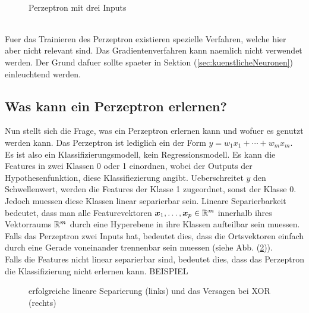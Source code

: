 \\
\begin{figure}[h!]
  \centering
  \caption{Perzeptron mit drei Inputs}
  \label{fi:perzeptron}
\end{figure}
\\
Fuer das Trainieren des Perzeptron existieren spezielle Verfahren, welche hier
aber nicht relevant sind. Das Gradientenverfahren kann naemlich nicht verwendet
werden. Der Grund dafuer sollte spaeter in Sektion (\ref{sec:kuenstlicheNeuronen}) einleuchtend werden.

\subsection{Was kann ein Perzeptron erlernen?}
Nun stellt sich die Frage, was ein Perzeptron erlernen kann und wofuer es genutzt werden kann.
Das Perzeptron ist lediglich ein  der Form
$y = w_1x_1 + \cdots + w_m x_m$. Es ist also ein Klassifizierungsmodell, kein Regressionsmodell.
Es kann die Features in zwei Klassen 0 oder 1 einordnen, wobei der Outputs der
Hypothesenfunktion, diese Klassifiezierung angibt.
Ueberschreitet $y$ den Schwellenwert, werden die Features der Klasse 1 zugeordnet, sonst
der Klasse 0.
Jedoch muessen diese Klassen linear separierbar sein.
\para{}
Lineare Separierbarkeit bedeutet, dass man alle Featurevektoren $\bm{x}_1,\ldots,\bm{x}_p \in \mathbb{R}^m$
innerhalb ihres Vektorraums $\mathbb{R}^m$ durch eine Hyperebene in ihre Klassen aufteilbar sein muessen.
Falls das Perzeptron zwei Inputs hat, bedeutet dies, dass die Ortsvektoren
einfach durch eine Gerade voneinander trennenbar sein muessen (siehe Abb.
(\ref{fig:linearer_Klassifikator})). \\
Falls die Features nicht linear separierbar sind, bedeutet dies, dass das
Perzeptron die Klassifizierung nicht erlernen kann.
BEISPIEL
\\
\begin{figure}[h!]
  \caption{erfolgreiche lineare Separierung (links) und das Versagen bei XOR (rechts)}
  \label{fig:linearer_Klassifikator}
\end{figure}
\para{}
\cite{wiki:perzeptron}
\cite{wiki:linear_separability}


